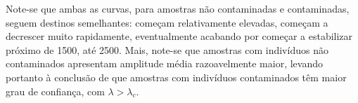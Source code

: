\documentclass[10pt]{article}
\begin{document}

Note-se que ambas as curvas, para amostras não contaminadas e contaminadas,
seguem destinos semelhantes: começam relativamente elevadas, começam a decrescer muito
rapidamente, eventualmente acabando por começar a estabilizar próximo de 1500, até 2500. Mais, note-se que amostras
com indivíduos não contaminados apresentam amplitude média razoavelmente maior, levando
portanto à conclusão de que amostras com indivíduos contaminados têm maior grau de confiança,
com $\lambda > \lambda_c$.
\end{document}

